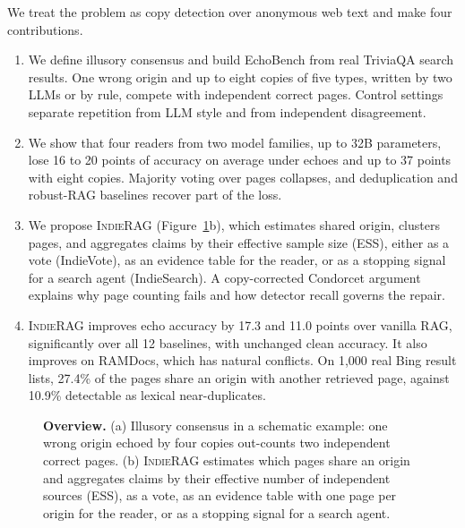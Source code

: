\documentclass[sigconf,review,anonymous]{acmart}
\newcommand{\sys}{\textsc{IndieRAG}}
\begin{document}
We treat the problem as copy detection over anonymous web text and make four contributions.
\begin{enumerate}[leftmargin=*,itemsep=1pt,topsep=2pt]
\item We define illusory consensus and build EchoBench from real TriviaQA search results. One wrong origin and up to
eight copies of five types, written by two LLMs or by rule, compete with independent correct pages. Control settings
separate repetition from LLM style and from independent disagreement.
\item We show that four readers from two model families, up to 32B parameters, lose 16 to 20 points of accuracy on
average under echoes and up to 37 points with eight copies. Majority voting over pages collapses, and deduplication
and robust-RAG baselines recover part of the loss.
\item We propose \sys{} (Figure~\ref{fig:overview}b), which estimates shared origin, clusters pages, and aggregates
claims by their effective sample size (ESS), either as a vote (IndieVote), as an evidence table for the reader, or as
a stopping signal for a search agent (IndieSearch). A copy-corrected Condorcet argument explains why page counting
fails and how detector recall governs the repair.
\item \sys{} improves echo accuracy by 17.3 and 11.0 points over vanilla RAG, significantly over all 12 baselines, with
unchanged clean accuracy. It also improves on RAMDocs, which has natural conflicts. On 1{,}000 real Bing result lists,
27.4\% of the pages share an origin with another retrieved page, against 10.9\% detectable as lexical near-duplicates.
\end{enumerate}

\begin{figure}[t]
\centering
\makebox[\textwidth][c]{}
\vspace{-1mm}
\caption{\textbf{Overview.} (a) Illusory consensus in a schematic example: one wrong origin echoed by four copies
out-counts two independent correct pages. (b) \sys{} estimates which pages share an origin and aggregates claims by
their effective number of independent sources (ESS), as a vote, as an evidence table with one page per origin for the
reader, or as a stopping signal for a search agent.}
\label{fig:overview}
\end{figure}

\end{document}
